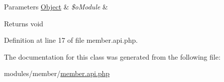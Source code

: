 \begin{DoxyParams}[1]{Parameters}
\hyperlink{classObject}{Object} & {\em \$o\-Module} & \\
\hline
\end{DoxyParams}
\begin{DoxyReturn}{Returns}
void 
\end{DoxyReturn}


Definition at line 17 of file member.\-api.\-php.



The documentation for this class was generated from the following file\-:\begin{DoxyCompactItemize}
\item 
modules/member/\hyperlink{member_8api_8php}{member.\-api.\-php}\end{DoxyCompactItemize}
